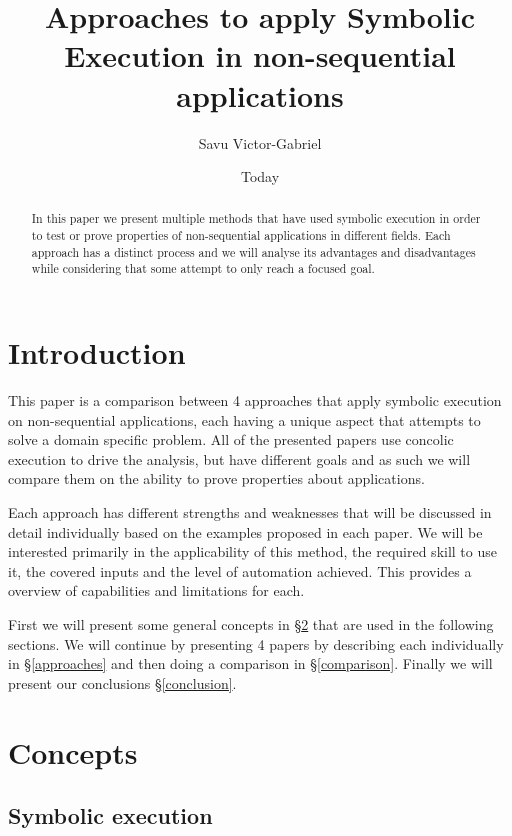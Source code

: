 \documentclass[10pt]{llncs}
\begin{document}
\title{Approaches to apply Symbolic Execution in non-sequential applications}
\author{Savu Victor-Gabriel}
\date{Today}
\maketitle

\begin{abstract}
	In this paper we present multiple methods that have used symbolic execution in order to test or prove properties of non-sequential applications in different fields. Each approach has a distinct process and we will analyse its advantages and disadvantages while considering that some attempt to only reach a focused goal.
\end{abstract}

\section{Introduction}

This paper is a comparison between 4 approaches that apply symbolic execution on non-sequential applications, each having a unique aspect that attempts to solve a domain specific problem. All of the presented papers use concolic execution to drive the analysis, but have different goals and as such we will compare them on the ability to prove properties about applications.

Each approach has different strengths and weaknesses that will be discussed in detail individually based on the examples proposed in each paper. We will be interested primarily in the applicability of this method, the required skill to use it, the covered inputs and the level of automation achieved. This provides a overview of capabilities and limitations for each.

First we will present some general concepts in §\ref{concepts} that are used in the following sections. We will continue by presenting 4 papers \cite{base3, base4, base5, base7} by describing each individually in §\ref{approaches} and then doing a comparison in §\ref{comparison}. Finally we will present our conclusions §\ref{conclusion}.

\section{Concepts}
\label{concepts}

\subsection{Symbolic execution}
\end{document}

